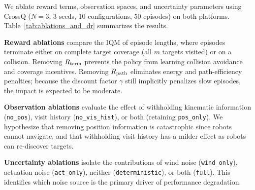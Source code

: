 \documentclass{article}
\begin{document}
We ablate reward terms, observation spaces, and uncertainty parameters using CrossQ ($N=3$, 3 seeds, 10 configurations, 50 episodes) on both platforms. Table~\ref{tab:ablations_and_dr} summarizes the results.

\textbf{Reward ablations} compare the IQM of episode lengths, where episodes terminate either on complete target coverage (all $m$ targets visited) or on a collision. Removing $R_{\mathrm{term}}$ prevents the policy from learning collision avoidance and coverage incentives. Removing $R_{\mathrm{path}}$ eliminates energy and path-efficiency penalties; because the discount factor $\gamma$ still implicitly penalizes slow episodes, the impact is expected to be moderate.

\textbf{Observation ablations} evaluate the effect of withholding kinematic information (\texttt{no\_pos}), visit history (\texttt{no\_vis\_hist}), or both (retaining \texttt{pos\_only}). We hypothesize that removing position information is catastrophic since robots cannot navigate, and that withholding visit history has a milder effect as robots can re-discover targets.

\textbf{Uncertainty ablations} isolate the contributions of wind noise (\texttt{wind\_only}), actuation noise (\texttt{act\_only}), neither (\texttt{deterministic}), or both (\texttt{full}). This identifies which noise source is the primary driver of performance degradation.
\end{document}
